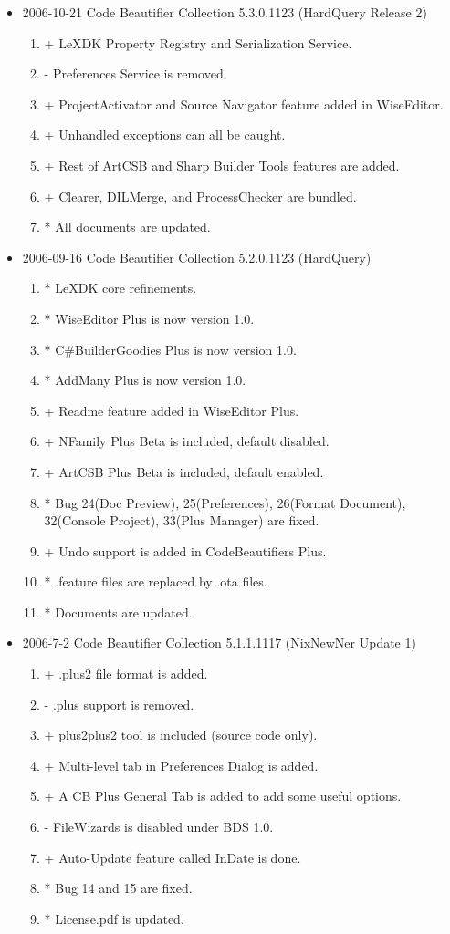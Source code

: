 \begin{itemize}
  \item 2006-10-21 Code Beautifier Collection 5.3.0.1123 (HardQuery Release 2)
    \begin{enumerate}
      \item + LeXDK Property Registry and Serialization Service.
      \item - Preferences Service is removed.
      \item + ProjectActivator and Source Navigator feature added in WiseEditor.
      \item + Unhandled exceptions can all be caught.
      \item + Rest of ArtCSB and Sharp Builder Tools features are added.
      \item + Clearer, DILMerge, and ProcessChecker are bundled.
      \item * All documents are updated.
    \end{enumerate}
  \item 2006-09-16 Code Beautifier Collection 5.2.0.1123 (HardQuery)
	\begin{enumerate}
	\item * LeXDK core refinements.
	\item * WiseEditor Plus is now version 1.0.
	\item * C\#BuilderGoodies Plus is now version 1.0.
	\item * AddMany Plus is now version 1.0.
	\item + Readme feature added in WiseEditor Plus.
	\item + NFamily Plus Beta is included, default disabled.
	\item + ArtCSB Plus Beta is included, default enabled.
	\item * Bug 24(Doc Preview), 25(Preferences), 26(Format Document), 32(Console
	Project), 33(Plus Manager) are fixed.
	\item + Undo support is added in CodeBeautifiers Plus.
	\item * .feature files are replaced by .ota files.
	\item * Documents are updated.
    \end{enumerate}

\item 2006-7-2 Code Beautifier Collection 5.1.1.1117 (NixNewNer Update 1)
	\begin{enumerate}
	\item + .plus2 file format is added.
	\item - .plus support is removed.
	\item + plus2plus2 tool is included (source code only).
	\item + Multi-level tab in Preferences Dialog is added.
	\item + A CB Plus General Tab is added to add some useful options.
	\item - FileWizards is disabled under BDS 1.0.
	\item + Auto-Update feature called InDate is done.
	\item * Bug 14 and 15 are fixed.
	\item * License.pdf is updated.
	\end{enumerate}


\end{itemize}
